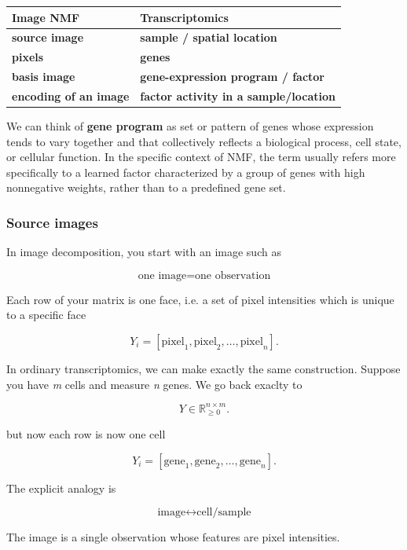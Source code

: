 \documentclass[11pt,a4paper]{article}
\begin{document}
\begin{center}
\begin{tabular}{ll}
\toprule
Image NMF & Transcriptomics \\
\midrule
\textbf{source image} & \textbf{sample / spatial location} \\
\textbf{pixels} & \textbf{genes} \\
\textbf{basis image} & \textbf{gene-expression program / factor} \\
\textbf{encoding of an image} & \textbf{factor activity in a sample/location} \\
\bottomrule
\end{tabular}
\end{center} 
\vspace{2mm}
We can think of \textbf{gene program} as set or pattern of genes whose expression tends to vary together and that collectively reflects a biological process, cell state, or cellular function. In the specific context of NMF, the term usually refers more specifically to a learned factor characterized by a group of genes with high nonnegative weights, rather than to a predefined gene set. 

\subsubsection{Source images}

In image decomposition, you start with an image such as

\[
\boxed{\text{one image} = \text{one observation}}
\]

Each row of your matrix is one face, i.e. a set of pixel intensities which is unique to a specific face

\[
Y_i =
[\text{pixel}_1,\text{pixel}_2,\ldots,\text{pixel}_{n}].
\]

In ordinary transcriptomics, we can make exactly the same construction. Suppose you have \textit{m} cells and measure \textit{n} genes. We go back exaclty to 

\[
Y\in\mathbb{R}_{\geq0}^{n\times m}.
\]

but now each row is now one cell

\[
Y_i =
[\text{gene}_1,\text{gene}_2,\ldots,\text{gene}_{n}].
\]

The explicit analogy is

\[
\boxed{
\text{image}
\longleftrightarrow
\text{cell/sample}
}
\]

The image is a single observation whose features are pixel intensities.
\end{document}
